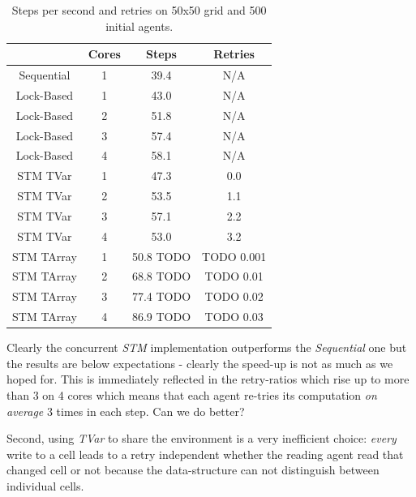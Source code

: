\begin{table}
	\centering
  	\begin{tabular}{ c || c | c | c }
                   & Cores & Steps & Retries  \\ \hline \hline 
    	Sequential & 1     & 39.4  & N/A      \\ \hline \hline   

    	Lock-Based & 1     & 43.0 & N/A       \\ \hline
    	Lock-Based & 2     & 51.8 & N/A       \\ \hline
    	Lock-Based & 3     & 57.4 & N/A       \\ \hline
    	Lock-Based & 4     & 58.1 & N/A       \\ \hline \hline   
   		
   		STM TVar   & 1     & 47.3 & 0.0       \\ \hline
   		STM TVar   & 2     & 53.5 & 1.1       \\ \hline
   		STM TVar   & 3     & 57.1 & 2.2 	  \\ \hline
   		STM TVar   & 4     & 53.0 & 3.2	  \\ \hline \hline   
   		
   		STM TArray & 1     & 50.8 TODO & TODO 0.001    \\ \hline
   		STM TArray & 2     & 68.8 TODO & TODO 0.01	  \\ \hline
   		STM TArray & 3     & 77.4 TODO & TODO 0.02	  \\ \hline
   		STM TArray & 4     & 86.9 TODO & TODO  0.03	  \\ \hline \hline   
   	\end{tabular}
  	
  	\caption{Steps per second and retries on 50x50 grid and 500 initial agents.}
	\label{tab:constant_agents_results}
\end{table}

Clearly the concurrent \textit{STM} implementation outperforms the \textit{Sequential} one but the results are below expectations - clearly the speed-up is not as much as we hoped for. This is immediately reflected in the retry-ratios which rise up to more than 3 on 4 cores which means that each agent re-tries its computation \textit{on average} 3 times in each step. Can we do better?

Second, using \textit{TVar} to share the environment is a very inefficient choice: \textit{every} write to a cell leads to a retry independent whether the reading agent read that changed cell or not because the data-structure can not distinguish between individual cells.

